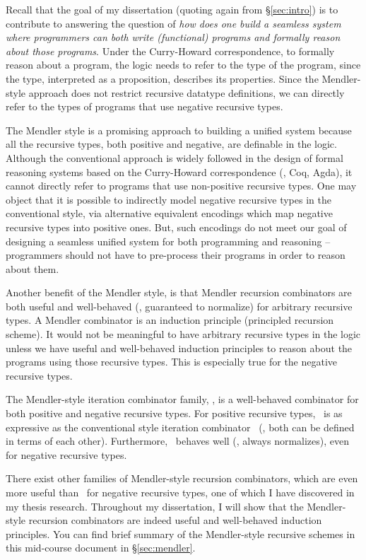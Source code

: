 Recall that the goal of my dissertation (quoting again from \S\ref{sec:intro})
is to contribute to answering the question of {\em how does one build a
seamless system where programmers can both write (functional) programs and
formally reason about those programs}. Under the Curry-Howard correspondence,
to formally reason about a program, the logic needs to refer to the type of
the program, since the type, interpreted as a proposition, describes its
properties. Since the Mendler-style approach does not restrict recursive
datatype definitions, we can directly refer to the types of programs that use
negative recursive types.

The Mendler style is a promising approach to building a unified system because
all the recursive types, both positive and negative, are definable in the
logic. Although the conventional approach is widely followed in the design of
formal reasoning systems based on the Curry-Howard correspondence (\eg, Coq,
Agda), it cannot directly refer to programs that use non-positive recursive
types. One may object that it is possible to indirectly model negative
recursive types in the conventional style, via alternative equivalent
encodings which map negative recursive types into positive ones. But, such
encodings do not meet our goal of designing a seamless unified system for both
programming and reasoning -- programmers should not have to pre-process their
programs in order to reason about them.

Another benefit of the Mendler style, is that Mendler recursion combinators
are both useful and well-behaved (\ie, guaranteed to normalize) for arbitrary
recursive types. A Mendler combinator is an induction principle
(principled recursion scheme). It would not be meaningful to have
arbitrary recursive types in the logic unless we have useful and well-behaved
induction principles to reason about the programs using those recursive types.
This is especially true for the negative recursive types.

The Mendler-style iteration combinator family, \MIt, is a well-behaved
combinator for both positive and negative recursive types.
For positive recursive types, \MIt\ is as expressive as the conventional style
iteration combinator \It\ (\ie, both can be defined in terms of each other). 
Furthermore, \MIt\ behaves well (\ie, always normalizes), even for negative
recursive types.

There exist other families of Mendler-style recursion combinators,
which are even more useful than \MIt\ for negative recursive types,
one of which I have discovered in my thesis research. Throughout
my dissertation, I will show that the Mendler-style recursion combinators are
indeed useful and well-behaved induction principles. You can find brief
summary of the Mendler-style recursive schemes in this mid-course document
in \S\ref{sec:mendler}.


